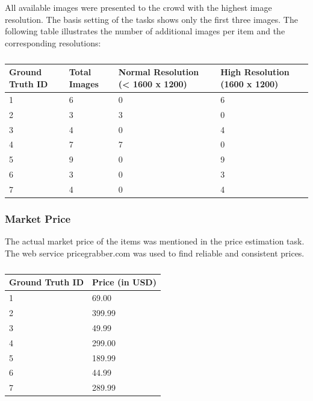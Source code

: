 All available images were presented to the crowd with the highest image resolution. The basis setting of the tasks shows only the first three images. The following table illustrates the number of additional images per item and the corresponding resolutions: 
\begin{table}[h!]
	\begin{center}
	\begin{tabular}{| l | l | l | p{10cm} |}
		\hline
		Ground Truth ID & Total Images & Normal Resolution (< 1600 x 1200) & High Resolution (1600 x 1200) \\
		\hline
		1 & 6 & 0 & 6 \\
		\hline
		2 & 3 & 3 & 0 \\
		\hline
		3 & 4 & 0 & 4 \\
		\hline
		4 & 7 & 7 & 0 \\
		\hline
		5 & 9 & 0 & 9 \\
		\hline
		6 & 3 & 0 & 3 \\
		\hline
		7 & 4 & 0 & 4 \\
		\hline
	\end{tabular}
	\end{center}
	\caption{}
\end{table}
\subsubsection{Market Price}
The actual market price of the items was mentioned in the price estimation task. The web service pricegrabber.com was used to find reliable and consistent prices. 
\begin{table}[h!]
	\begin{center}
	\begin{tabular}{| l | p{10cm} |}
		\hline
		Ground Truth ID & Price (in USD) \\
		\hline
		1 & 69.00 \\
		\hline
		2 & 399.99 \\
		\hline
		3 & 49.99 \\
		\hline
		4 & 299.00 \\
		\hline
		5 & 189.99 \\
		\hline
		6 & 44.99 \\
		\hline
		7 & 289.99 \\
		\hline
	\end{tabular}
	\end{center}
	\caption{}
\end{table}
